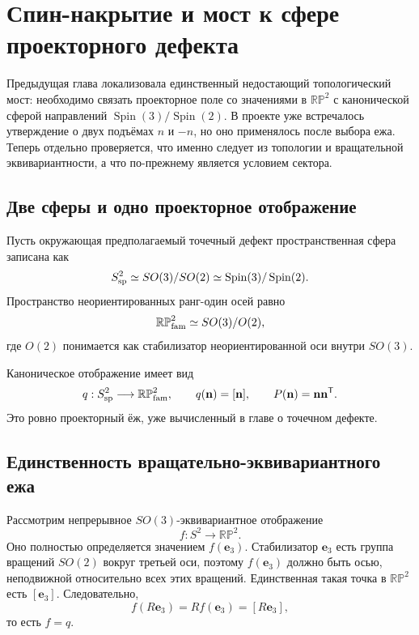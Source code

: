 \chapter{Спин-накрытие и мост к сфере проекторного дефекта}

Предыдущая глава локализовала единственный недостающий топологический
мост: необходимо связать проекторное поле со значениями в
$\mathbb{RP}^2$ с канонической сферой направлений
$\operatorname{Spin}(3)/\operatorname{Spin}(2)$. В проекте уже встречалось
утверждение о двух подъёмах $n$ и $-n$, но оно применялось после выбора
ежа. Теперь отдельно проверяется, что именно следует из топологии и
вращательной эквивариантности, а что по-прежнему является условием сектора.

\section{Две сферы и одно проекторное отображение}

Пусть окружающая предполагаемый точечный дефект пространственная сфера
записана как
\begin{equation}
 S^2_{\rm sp}
 \simeq SO(3)/SO(2)
 \simeq \operatorname{Spin}(3)/\operatorname{Spin}(2).
 \label{eq:v5-spin-bridge-spatial-sphere}
\end{equation}
Пространство неориентированных ранг-один осей равно
\begin{equation}
 \mathbb{RP}^2_{\rm fam}
 \simeq SO(3)/O(2),
 \label{eq:v5-spin-bridge-projective-target}
\end{equation}
где $O(2)$ понимается как стабилизатор неориентированной оси внутри
$SO(3)$.

Каноническое отображение имеет вид
\begin{equation}
 q:S^2_{\rm sp}\longrightarrow\mathbb{RP}^2_{\rm fam},
 \qquad
 q(\mathbf n)=[\mathbf n],
 \qquad
 P(\mathbf n)=\mathbf n\mathbf n^{\mathsf T}.
 \label{eq:v5-spin-bridge-quotient-map}
\end{equation}
Это ровно проекторный ёж, уже вычисленный в главе о точечном дефекте.

\section{Единственность вращательно-эквивариантного ежа}

Рассмотрим непрерывное $SO(3)$-эквивариантное отображение
\begin{equation}
 f:S^2\longrightarrow\mathbb{RP}^2.
\end{equation}
Оно полностью определяется значением $f(\mathbf e_3)$. Стабилизатор
$\mathbf e_3$ есть группа вращений $SO(2)$ вокруг третьей оси, поэтому
$f(\mathbf e_3)$ должно быть осью, неподвижной относительно всех этих
вращений. Единственная такая точка в $\mathbb{RP}^2$ есть
$[\mathbf e_3]$. Следовательно,
\begin{equation}
 f(R\mathbf e_3)=R f(\mathbf e_3)=[R\mathbf e_3],
\end{equation}
то есть $f=q$.

